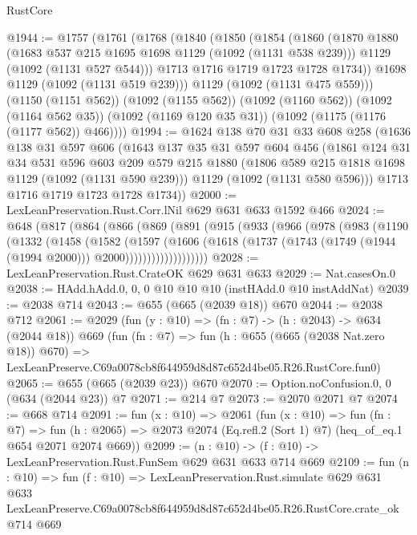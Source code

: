 \begin{lexlean}{RustCore}
\begin{coremodule}
@1944 := @1757
    (@1761
      (@1768
        (@1840
          (@1850
            (@1854
              (@1860
                (@1870
                  @1880
                  (@1683 @537 @215 @1695 @1698 @1129 (@1092 (@1131 @538 @239)))
                  @1129
                  (@1092 (@1131 @527 @544)))
                @1713
                @1716
                @1719
                @1723
                @1728
                @1734))
            @1698
            @1129
            (@1092 (@1131 @519 @239)))
          @1129
          (@1092 (@1131 @475 @559)))
        (@1150 (@1151 @562))
        (@1092 (@1155 @562))
        (@1092 (@1160 @562))
        (@1092 (@1164 @562 @35))
        (@1092 (@1169 @120 @35 @31))
        (@1092 (@1175 (@1176 (@1177 @562)) @466))))
@1994 := @1624
    @138
    @70
    @31
    @33
    @608
    @258
    (@1636
      @138
      @31
      @597
      @606
      (@1643
        @137
        @35
        @31
        @597
        @604
        @456
        (@1861
          @124
          @31
          @34
          @531
          @596
          @603
          @209
          @579
          @215
          @1880
          (@1806 @589 @215 @1818 @1698 @1129 (@1092 (@1131 @590 @239)))
          @1129
          (@1092 (@1131 @580 @596)))
        @1713
        @1716
        @1719
        @1723
        @1728
        @1734))
@2000 := LexLeanPreservation.Rust.Corr.lNil @629 @631 @633 @1592 @466
@2024 := @648
    (@817
      (@864
        (@866
          (@869
            (@891
              (@915
                (@933
                  (@966
                    (@978
                      (@983
                        (@1190
                          (@1332
                            (@1458
                              (@1582
                                (@1597
                                  (@1606
                                    (@1618
                                      (@1737
                                        (@1743
                                          (@1749 (@1944 (@1994 @2000)))
                                          @2000)))))))))))))))))))
@2028 := LexLeanPreservation.Rust.CrateOK @629 @631 @633
@2029 := Nat.casesOn.{0}
@2038 := HAdd.hAdd.{0, 0, 0} @10 @10 @10 (instHAdd.{0} @10 instAddNat)
@2039 := @2038 @714
@2043 := @655 (@665 (@2039 @18)) @670
@2044 := @2038 @712
@2061 := @2029
    (fun (y : @10) => (fn : @7) -> (h : @2043) -> @634 (@2044 @18))
    @669
    (fun (fn : @7) =>
    fun (h : @655 (@665 (@2038 Nat.zero @18)) @670) =>
    LexLeanPreserve.C69a0078cb8f644959d8d87c652d4be05.R26.RustCore.fun0)
@2065 := @655 (@665 (@2039 @23)) @670
@2070 := Option.noConfusion.{0, 0} (@634 (@2044 @23)) @7
@2071 := @214 @7
@2073 := @2070 @2071 @7
@2074 := @668 @714
@2091 := fun (x : @10) =>
  @2061
    (fun (x : @10) =>
    fun (fn : @7) =>
    fun (h : @2065) => @2073 @2074 (Eq.refl.{2} (Sort 1) @7) (heq_of_eq.{1} @654 @2071 @2074 @669))
@2099 := (n : @10) -> (f : @10) -> LexLeanPreservation.Rust.FunSem @629 @631 @633 @714 @669
@2109 := fun (n : @10) =>
  fun (f : @10) =>
  LexLeanPreservation.Rust.simulate
    @629
    @631
    @633
    LexLeanPreserve.C69a0078cb8f644959d8d87c652d4be05.R26.RustCore.crate_ok
    @714
    @669
\end{coremodule}
\end{lexlean}
